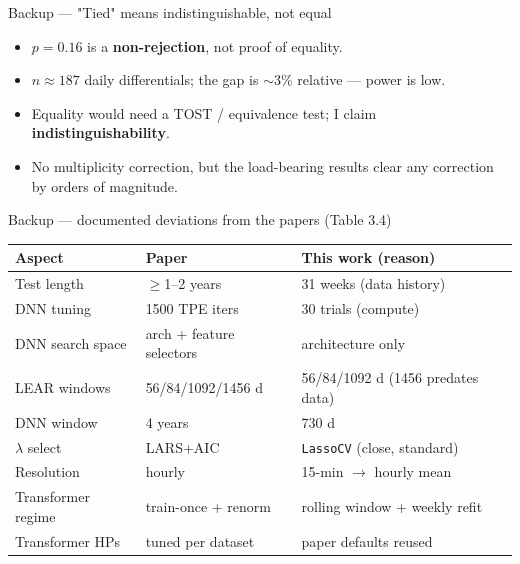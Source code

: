 \documentclass[aspectratio=169,10pt]{beamer}
\begin{document}
\begin{frame}{Backup --- "Tied" means indistinguishable, not equal}
  \begin{itemize}
    \item $p=0.16$ is a \textbf{non-rejection}, not proof of equality.
    \item $n\approx187$ daily differentials; the gap is $\sim$3\% relative --- power is low.
    \item Equality would need a TOST / equivalence test; I claim \textbf{indistinguishability}.
    \item No multiplicity correction, but the load-bearing results clear any correction by
      orders of magnitude.
  \end{itemize}
\end{frame}

\begin{frame}{Backup --- documented deviations from the papers \hfill\small(Table 3.4)}
  \footnotesize
  \begin{tabular}{lll}
    \toprule
    Aspect & Paper & This work (reason) \\
    \midrule
    Test length      & $\ge$1--2 years        & 31 weeks (data history) \\
    DNN tuning        & 1500 TPE iters         & 30 trials (compute) \\
    DNN search space  & arch + feature selectors & architecture only \\
    LEAR windows      & 56/84/1092/1456 d      & 56/84/1092 d (1456 predates data) \\
    DNN window        & 4 years                & 730 d \\
    $\lambda$ select  & LARS+AIC               & \texttt{LassoCV} (close, standard) \\
    Resolution        & hourly                 & 15-min $\to$ hourly mean \\
    Transformer regime& train-once + renorm    & rolling window + weekly refit \\
    Transformer HPs   & tuned per dataset      & paper defaults reused \\
    \bottomrule
  \end{tabular}
\end{frame}
\end{document}
